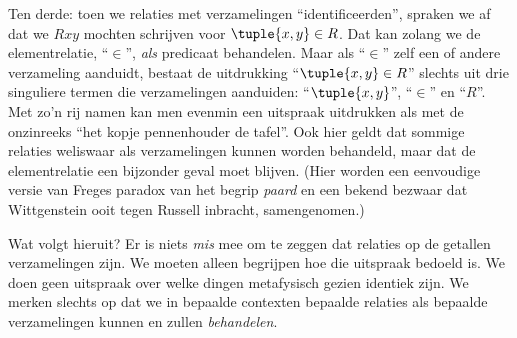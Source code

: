 \documentclass[../../../include/open-logic-section]{subfiles}
\begin{document}
Ten derde: toen we relaties met verzamelingen ``identificeerden'',
spraken we af dat we $Rxy$ mochten schrijven voor $\tuple{x,y} \in R$.
Dat kan zolang we de elementrelatie, ``$\in$'', \emph{als} predicaat
behandelen. Maar als ``$\in$'' zelf een of andere verzameling aanduidt,
bestaat de uitdrukking ``$\tuple{x,y} \in R$'' slechts uit drie
singuliere termen die verzamelingen aanduiden: ``$\tuple{x,y}$'',
``$\in$'' en ``$R$''. Met zo'n rij namen kan men evenmin een uitspraak
uitdrukken als met de onzinreeks ``het kopje pennenhouder de tafel''.
Ook hier geldt dat sommige relaties weliswaar als verzamelingen kunnen
worden behandeld, maar dat de elementrelatie een bijzonder geval moet
blijven. (Hier worden een eenvoudige versie van Freges paradox van het
begrip \emph{paard} en een bekend bezwaar dat Wittgenstein ooit tegen
Russell inbracht, samengenomen.)

Wat volgt hieruit? Er is niets \emph{mis} mee om te zeggen dat relaties
op de getallen verzamelingen zijn. We moeten alleen begrijpen hoe die
uitspraak bedoeld is. We doen geen uitspraak over welke dingen
metafysisch gezien identiek zijn. We merken slechts op dat we in bepaalde contexten bepaalde
relaties als bepaalde verzamelingen kunnen en zullen \emph{behandelen}.
\end{document}

